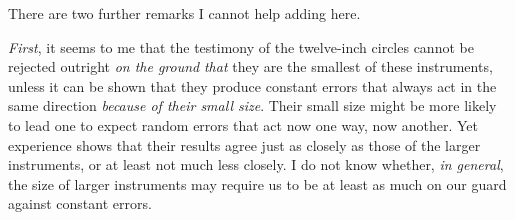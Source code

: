 \par\indent There are two further remarks I cannot help adding here.

\par\indent \emph{First}, it seems to me that the testimony of the twelve-inch circles cannot be rejected outright \emph{on the ground} \emph{that} they are the smallest of these instruments, unless it can be shown that they produce constant errors that always act in the same direction \emph{because of their small size}. Their small size might be more likely to lead one to expect random errors that act now one way, now another. Yet experience shows that their results agree just as closely as those of the larger instruments, or at least not much less closely. I do not know whether, \emph{in general}, the size of larger instruments may require us to be at least as much on our guard against constant errors.

